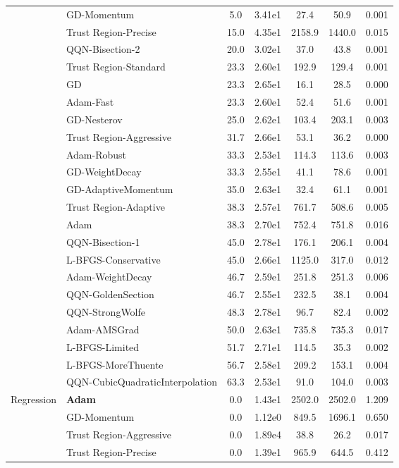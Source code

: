 \documentclass{article}
\begin{document}
\begin{table}[htbp]
{\begin{tabular}{p{2.5cm}p{2.5cm}*{5}{c}}
 & GD-Momentum & 5.0 & 3.41e1 & 27.4 & 50.9 & 0.001 \\
 & Trust Region-Precise & 15.0 & 4.35e1 & 2158.9 & 1440.0 & 0.015 \\
 & QQN-Bisection-2 & 20.0 & 3.02e1 & 37.0 & 43.8 & 0.001 \\
 & Trust Region-Standard & 23.3 & 2.60e1 & 192.9 & 129.4 & 0.001 \\
 & GD & 23.3 & 2.65e1 & 16.1 & 28.5 & 0.000 \\
 & Adam-Fast & 23.3 & 2.60e1 & 52.4 & 51.6 & 0.001 \\
 & GD-Nesterov & 25.0 & 2.62e1 & 103.4 & 203.1 & 0.003 \\
 & Trust Region-Aggressive & 31.7 & 2.66e1 & 53.1 & 36.2 & 0.000 \\
 & Adam-Robust & 33.3 & 2.53e1 & 114.3 & 113.6 & 0.003 \\
 & GD-WeightDecay & 33.3 & 2.55e1 & 41.1 & 78.6 & 0.001 \\
 & GD-AdaptiveMomentum & 35.0 & 2.63e1 & 32.4 & 61.1 & 0.001 \\
 & Trust Region-Adaptive & 38.3 & 2.57e1 & 761.7 & 508.6 & 0.005 \\
 & Adam & 38.3 & 2.70e1 & 752.4 & 751.8 & 0.016 \\
 & QQN-Bisection-1 & 45.0 & 2.78e1 & 176.1 & 206.1 & 0.004 \\
 & L-BFGS-Conservative & 45.0 & 2.66e1 & 1125.0 & 317.0 & 0.012 \\
 & Adam-WeightDecay & 46.7 & 2.59e1 & 251.8 & 251.3 & 0.006 \\
 & QQN-GoldenSection & 46.7 & 2.55e1 & 232.5 & 38.1 & 0.004 \\
 & QQN-StrongWolfe & 48.3 & 2.78e1 & 96.7 & 82.4 & 0.002 \\
 & Adam-AMSGrad & 50.0 & 2.63e1 & 735.8 & 735.3 & 0.017 \\
 & L-BFGS-Limited & 51.7 & 2.71e1 & 114.5 & 35.3 & 0.002 \\
 & L-BFGS-MoreThuente & 56.7 & 2.58e1 & 209.2 & 153.1 & 0.004 \\
 & QQN-CubicQuadraticInterpolation & 63.3 & 2.53e1 & 91.0 & 104.0 & 0.003 \\
\midrule
\multirow{25}{*}{Regression} & \textbf{Adam} & 0.0 & 1.43e1 & 2502.0 & 2502.0 & 1.209 \\
 & GD-Momentum & 0.0 & 1.12e0 & 849.5 & 1696.1 & 0.650 \\
 & Trust Region-Aggressive & 0.0 & 1.89e4 & 38.8 & 26.2 & 0.017 \\
 & Trust Region-Precise & 0.0 & 1.39e1 & 965.9 & 644.5 & 0.412 \\

\end{tabular}}
\end{table}
\end{document}
